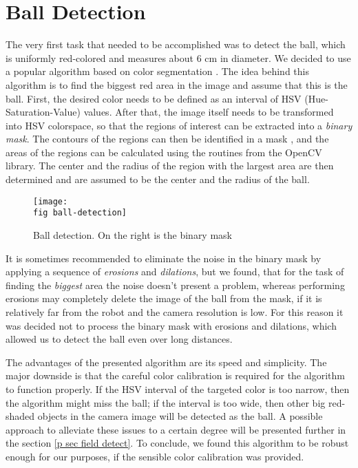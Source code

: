 \section{Ball Detection}
\label{p sec ball detection}

The very first task that needed to be accomplished was to detect the ball,
which is uniformly red-colored and measures about 6 cm in diameter. We decided
to use a popular algorithm based on color segmentation \cite{ball-detect}. The
idea behind this algorithm is to find the biggest red area in the image and
assume that this is the ball. First, the desired color needs to be defined as
an interval of HSV (Hue-Saturation-Value) \cite{hsv} values. After that, the
image itself needs to be transformed into HSV colorspace, so that the regions
of interest can be extracted into a \textit{binary mask}. The contours of the
regions can then be identified in a mask \cite{contours}, and the areas of the
regions can be calculated using the routines from the OpenCV library. The
center and the radius of the region with the largest area are then determined
and are assumed to be the center and the radius of the ball.

\begin{figure}[ht]
  \texttt{[image: \\fig ball-detection]}
  \caption[Ball detection]{Ball detection. On the right is the binary mask}
  \label{p figure ball-detection}
\end{figure}

It is sometimes recommended \cite{ball-detect} to eliminate the noise in the
binary mask by applying a sequence of \textit{erosions} and \textit{dilations},
but we found, that for the task of finding the \textit{biggest} area the noise
doesn't present a problem, whereas performing erosions may completely delete
the image of the ball from the mask, if it is relatively far from the robot and
the camera resolution is low. For this reason it was decided not to process the
binary mask with erosions and dilations, which allowed us to detect the ball
even over long distances.

The advantages of the presented algorithm are its speed and simplicity. The
major downside is that the careful color calibration is required for the
algorithm to function properly. If the HSV interval of the targeted color is
too narrow, then the algorithm might miss the ball; if the interval is too
wide, then other big red-shaded objects in the camera image will be detected as
the ball. A possible approach to alleviate these issues to a certain degree
will be presented further in the section \ref{p sec field detect}. To
conclude, we found this algorithm to be robust enough for our purposes, if the
sensible color calibration was provided.

